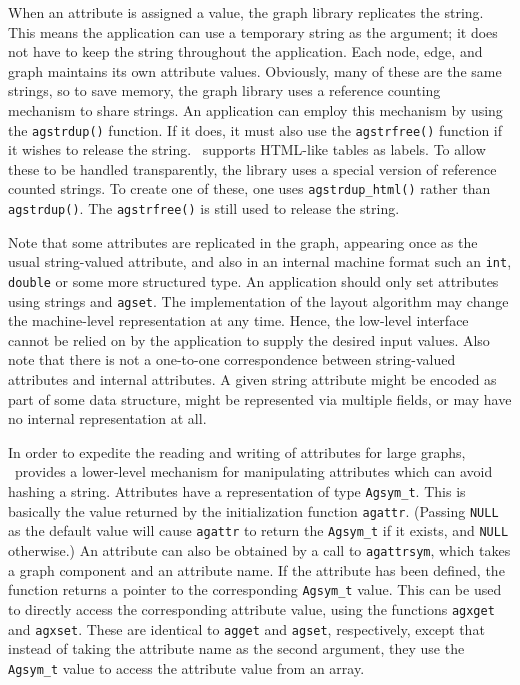 When an attribute is assigned a value, the graph library replicates the
string. This means the application can use a temporary string as the
argument; it does not have to keep the string throughout the application.
Each node, edge, and graph maintains its own attribute 
values. Obviously, many of these are the same strings, so to save
memory, the graph library uses a reference counting mechanism to 
share strings. An application can employ this mechanism by using
the {\tt agstrdup()} function. If it does, it must also use the
{\tt agstrfree()} function if it wishes to release the string.
\gviz\ supports HTML-like tables as labels. To allow these to be handled
transparently, the library uses a special version of reference counted
strings. To create one of these, one uses {\tt agstrdup\_html()}
rather than {\tt agstrdup()}. The {\tt agstrfree()} is still used to
release the string.

Note that some attributes are replicated in the graph, appearing once
as the usual string-valued attribute, and also in an internal machine
format such an {\tt int}, {\tt double} or some more structured type.
An application should only set attributes using strings and {\tt agset}.
The implementation of the layout algorithm
may change the machine-level representation at any time.
Hence, the low-level
interface cannot be relied on by the application to supply the desired
input values. Also note that there
is not a one-to-one correspondence between string-valued
attributes and internal attributes. A given string attribute might be
encoded as part of some data structure, might be represented via 
multiple fields, or may have no internal representation at all. 

In order to expedite the reading and writing of attributes for large
graphs, \gviz\ provides a lower-level mechanism for manipulating attributes
which can avoid hashing a string.
Attributes have a representation of type \verb+Agsym_t+. This is basically the
value returned by the initialization function {\tt agattr}. (Passing {\tt NULL}
as the default value will cause {\tt agattr} to return the \verb+Agsym_t+ if
it exists, and {\tt NULL} otherwise.)
An attribute can also be obtained by a call to {\tt agattrsym}, which takes
a graph component and an attribute name. If the attribute has been defined,
the function returns a pointer to the corresponding \verb+Agsym_t+ value. 
This can be used to directly access the corresponding attribute value,
using the functions {\tt agxget} and {\tt agxset}. These are identical to 
{\tt agget} and {\tt agset}, respectively, except that instead of
taking the attribute name as the second argument, they use 
the \verb+Agsym_t+ value to access the attribute
value from an array.

